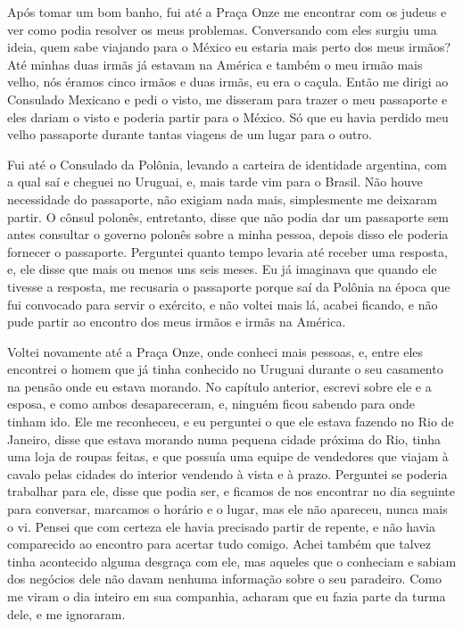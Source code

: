 Após tomar um bom banho, fui até a Praça Onze me encontrar com os judeus
e ver como podia resolver os meus problemas. Conversando com eles surgiu
uma ideia, quem sabe viajando para o México eu estaria mais perto dos
meus irmãos? Até minhas duas irmãs já estavam na América e também o meu
irmão mais velho, nós éramos cinco irmãos e duas irmãs, eu era o caçula.
Então me dirigi ao Consulado Mexicano e pedi o visto, me disseram para
trazer o meu passaporte e eles dariam o visto e poderia partir para o
México. Só que eu havia perdido meu velho passaporte durante tantas
viagens de um lugar para o outro.

Fui até o Consulado da Polônia, levando a carteira de identidade
argentina, com a qual saí e cheguei no Uruguai, e, mais tarde vim para o
Brasil. Não houve necessidade do passaporte, não exigiam nada mais,
simplesmente me deixaram partir. O cônsul polonês, entretanto, disse que
não podia dar um passaporte sem antes consultar o governo polonês sobre
a minha pessoa, depois disso ele poderia fornecer o passaporte.
Perguntei quanto tempo levaria até receber uma resposta, e, ele disse
que mais ou menos uns seis meses. Eu já imaginava que quando ele tivesse
a resposta, me recusaria o passaporte porque saí da Polônia na época que
fui convocado para servir o exército, e não voltei mais lá, acabei
ficando, e não pude partir ao encontro dos meus irmãos e irmãs na
América.

Voltei novamente até a Praça Onze, onde conheci mais pessoas, e, entre
eles encontrei o homem que já tinha conhecido no Uruguai durante o seu
casamento na pensão onde eu estava morando. No capítulo anterior,
escrevi sobre ele e a esposa, e como ambos desapareceram, e, ninguém
ficou sabendo para onde tinham ido. Ele me reconheceu, e eu perguntei o
que ele estava fazendo no Rio de Janeiro, disse que estava morando numa
pequena cidade próxima do Rio, tinha uma loja de roupas feitas, e que
possuía uma equipe de vendedores que viajam à cavalo pelas cidades do
interior vendendo à vista e à prazo. Perguntei se poderia trabalhar para
ele, disse que podia ser, e ficamos de nos encontrar no dia seguinte
para conversar, marcamos o horário e o lugar, mas ele não apareceu,
nunca mais o vi. Pensei que com certeza ele havia precisado partir de
repente, e não havia comparecido ao encontro para acertar tudo comigo.
Achei também que talvez tinha acontecido alguma desgraça com ele, mas
aqueles que o conheciam e sabiam dos negócios dele não davam nenhuma
informação sobre o seu paradeiro. Como me viram o dia inteiro em sua
companhia, acharam que eu fazia parte da turma dele, e me ignoraram.

